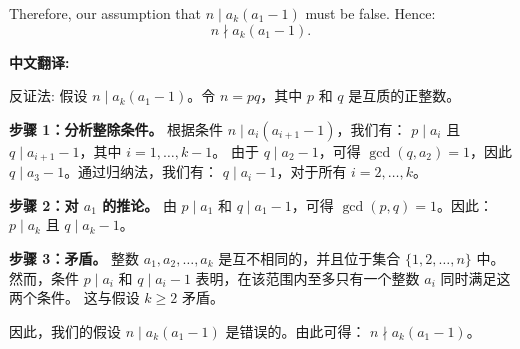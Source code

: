 \documentclass[a4paper]{article}
\begin{document}
    Therefore, our assumption that $n \mid a_k(a_1-1)$ must be false. Hence:
    \[n \nmid a_k(a_1-1).\]

    \[\]
    \textbf{中文翻译:}

    反证法: 假设 $n \mid a_k(a_1-1)$。令 $n = pq$，其中 $p$ 和 $q$ 是互质的正整数。

    \textbf{步骤 1：分析整除条件。}  
    根据条件 $n \mid a_i(a_{i+1}-1)$，我们有：
    $p \mid a_i$ 且 $q \mid a_{i+1}-1$，其中 $i = 1, \ldots, k-1$。
    由于 $q \mid a_2-1$，可得 $\gcd(q, a_2) = 1$，因此 $q \mid a_3-1$。通过归纳法，我们有：
    $q \mid a_i-1$，对于所有 $i = 2, \ldots, k$。

    \textbf{步骤 2：对 $a_1$ 的推论。}  
    由 $p \mid a_1$ 和 $q \mid a_1-1$，可得 $\gcd(p, q) = 1$。因此：
    $p \mid a_k$ 且 $q \mid a_k-1$。

    \textbf{步骤 3：矛盾。}  
    整数 $a_1, a_2, \ldots, a_k$ 是互不相同的，并且位于集合 $\{1, 2, \ldots, n\}$ 中。
    然而，条件 $p \mid a_i$ 和 $q \mid a_i-1$ 表明，在该范围内至多只有一个整数 $a_i$ 同时满足这两个条件。
    这与假设 $k \geq 2$ 矛盾。

    因此，我们的假设 $n \mid a_k(a_1-1)$ 是错误的。由此可得：
    $n \nmid a_k(a_1-1)$。
\end{document}
